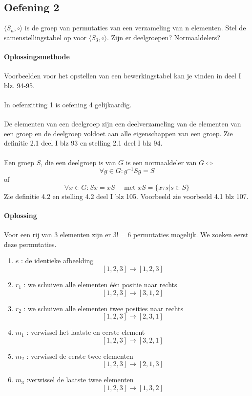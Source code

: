\documentclass[11pt,a4paper,titlepage]{article}
\begin{document}
\subsection{Oefening 2}
 $\langle S_n, \circ \rangle$ is de groep van permutaties van een verzameling van n elementen. Stel de samenstellingstabel op voor $\langle S_3, \circ \rangle$. Zijn er deelgroepen? Normaaldelers?
\\ \\ \textbf{Oplossingsmethode} \\ \\
Voorbeelden voor het opstellen van een bewerkingstabel kan je vinden in deel I blz. 94-95. \\ \\
In oefenzitting 1 is oefening 4 gelijkaardig. \\ \\
De elementen van een deelgroep zijn een deelverzameling van de elementen van een groep en de deelgroep voldoet aan alle eigenschappen van een groep. Zie definitie 2.1 deel I blz 93 en stelling 2.1 deel I blz 94. \\ \\
Een groep $S$, die een deelgroep is van $G$ is een normaaldeler van $G \Leftrightarrow$
	$$\forall g \in G : g^{-1} Sg = S$$
of
	$$\forall x \in G : Sx = xS \quad  \text{ met } xS = \{x\tau s|s\in S\}$$
Zie definitie 4.2 en stelling 4.2 deel I blz 105. Voorbeeld zie voorbeeld 4.1 blz 107.
\\ \\ \textbf{Oplossing} \\ \\
Voor een rij van 3 elementen zijn er $3! = 6$ permutaties mogelijk. We zoeken eerst deze permutaties.
\begin{enumerate}
\item $e$ : de identieke afbeelding $$[1,2,3] \rightarrow [1,2,3]$$
\item $r_1$ : we schuiven alle elementen één positie naar rechts $$[1,2,3] \rightarrow [3,1,2]$$
\item $r_2$ : we schuiven alle elementen twee posities naar rechts $$[1,2,3] \rightarrow [2,3,1]$$
\item $m_1$ : verwissel het laatste en eerste element $$[1,2,3] \rightarrow [3,2,1]$$
\item $m_2$ : verwissel de eerste twee elementen $$[1,2,3] \rightarrow [2,1,3]$$
\item $m_3$ :verwissel de laatste twee elementen $$[1,2,3] \rightarrow [1,3,2]$$
\end{enumerate}
\end{document}
